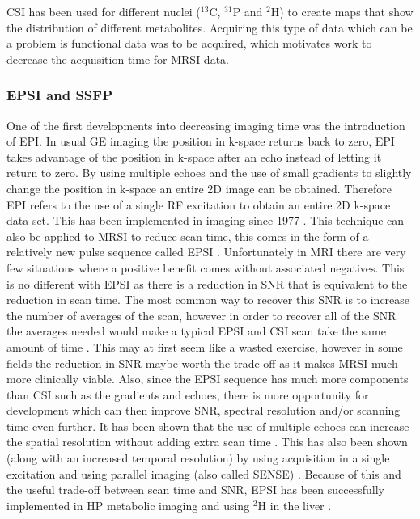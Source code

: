 \ac{CSI} has been used for different nuclei ($^{13}$C, $^{31}$P and $^2$H) to create maps that show the distribution of different metabolites. Acquiring this type of data which can be a problem is functional data was to be acquired, which motivates work to decrease the acquisition time for \ac{MRSI} data.

\subsubsection{EPSI and SSFP}

One of the first developments into decreasing imaging time was the introduction of \ac{EPI}. In usual \ac{GE} imaging the position in k-space returns back to zero, \ac{EPI} takes advantage of the position in k-space after an echo instead of letting it return to zero. By using multiple echoes and the use of small gradients to slightly change the position in k-space an entire 2D image can be obtained. Therefore \ac{EPI} refers to the use of a single \ac{RF} excitation to obtain an entire 2D k-space data-set. This has been implemented in imaging since 1977 \cite{Mansfield1977Multi-planarEchoes}. This technique can also be applied to \ac{MRSI} to reduce scan time, this comes in the form of a relatively new pulse sequence called \ac{EPSI} \cite{Mulkern2001EchoImaging}. Unfortunately in \ac{MRI} there are very few situations where a positive benefit comes without associated negatives. This is no different with \ac{EPSI} as there is a reduction in \ac{SNR} that is equivalent to the reduction in scan time. The most common way to recover this \ac{SNR} is to increase the number of averages of the scan, however in order to recover all of the \ac{SNR} the averages needed would make a typical \ac{EPSI} and \ac{CSI} scan take the same amount of time \cite{Mulkern2001EchoImaging}. This may at first seem like a wasted exercise, however in some fields the reduction in \ac{SNR} maybe worth the trade-off as it makes \ac{MRSI} much more clinically viable. Also, since the \ac{EPSI} sequence has much more components than \ac{CSI} such as the gradients and echoes, there is more opportunity for development which can then improve \ac{SNR}, spectral resolution and/or scanning time even further. It has been shown that the use of multiple echoes can increase the spatial resolution without adding extra scan time \cite{Furuyama2011Multi-echo-basedScanner}. This has also been shown (along with an increased temporal resolution) by using acquisition in a single excitation and using parallel imaging (also called \ac{SENSE}) \cite{Posse2009Single-shotImaging}. Because of this and the useful trade-off between scan time and SNR, \ac{EPSI} has been successfully implemented in \ac{HP} metabolic imaging \cite{Topping2020AcquisitionNuclei,Eldirdiri2018DevelopmentScanner} and using $^2$H in the liver \cite{Min2023Deuterium7T}.

